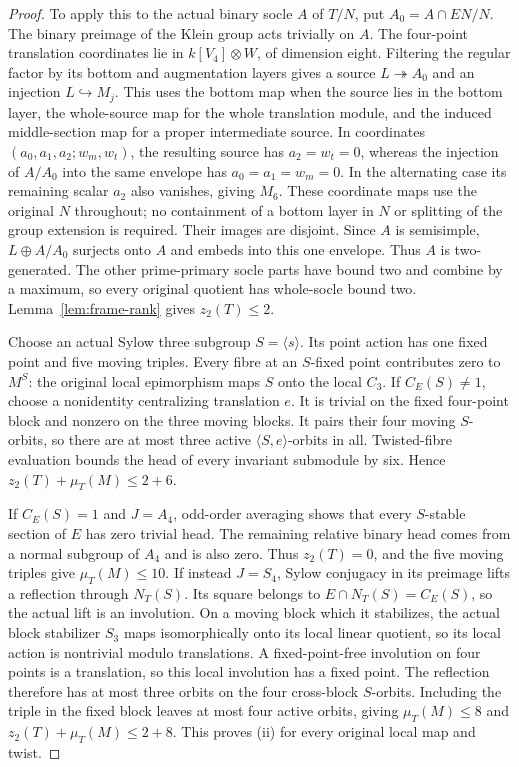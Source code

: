 \begin{proof}
To apply this to the actual binary socle $A$ of $T/N$, put
$A_0=A\cap EN/N$. The binary preimage of the Klein group acts
trivially on $A$. The four-point translation coordinates lie in
$k[V_4]\otimes W$, of dimension eight. Filtering the regular factor
by its bottom and augmentation layers gives a source
$L\twoheadrightarrow A_0$ and an injection $L\hookrightarrow M_j$.
This uses the bottom map when the source lies in the bottom layer,
the whole-source map for the whole translation module, and the
induced middle-section map for a proper intermediate source. In coordinates
$(a_0,a_1,a_2;w_m,w_t)$, the resulting source has
$a_2=w_t=0$, whereas the injection of $A/A_0$ into the same envelope
has $a_0=a_1=w_m=0$. In the alternating case its remaining scalar
$a_2$ also vanishes, giving $M_6$. These coordinate maps use the
original $N$ throughout; no containment of a bottom layer in $N$
or splitting of the group extension is required.
Their images are disjoint. Since $A$ is semisimple, $L\oplus A/A_0$
surjects onto $A$ and embeds into this one envelope. Thus $A$ is
two-generated. The other prime-primary socle parts have bound two
and combine by a maximum, so every original quotient has whole-socle
bound two. Lemma~\ref{lem:frame-rank} gives $z_2(T)\leq2$.

Choose an actual Sylow three subgroup $S=\langle s\rangle$.
Its point action has one fixed point and five moving triples.
Every fibre at an $S$-fixed point contributes zero to $M^S$:
the original local epimorphism maps $S$ onto the local $C_3$.
If $C_E(S)\ne1$, choose a nonidentity centralizing translation $e$.
It is trivial on the fixed four-point block and nonzero on the
three moving blocks. It pairs their four moving $S$-orbits, so
there are at most three active $\langle S,e\rangle$-orbits in all.
Twisted-fibre evaluation bounds the head of every invariant
submodule by six. Hence $z_2(T)+\mu_T(M)\leq2+6$.

If $C_E(S)=1$ and $J=A_4$, odd-order averaging shows that every
$S$-stable section of $E$ has zero trivial head. The remaining
relative binary head comes from a normal subgroup of $A_4$ and
is also zero. Thus $z_2(T)=0$, and the five moving triples give
$\mu_T(M)\leq10$.
If instead $J=S_4$, Sylow conjugacy in its preimage lifts a
reflection through $N_T(S)$.
Its square belongs to $E\cap N_T(S)=C_E(S)$, so the actual lift
is an involution. On a moving block which it stabilizes, the actual
block stabilizer $S_3$ maps isomorphically onto its local linear
quotient, so its local action is nontrivial modulo translations.
A fixed-point-free
involution on four points is a translation, so this local
involution has a fixed point. The reflection therefore has at
most three orbits on the four cross-block $S$-orbits. Including
the triple in the fixed block leaves at most four active orbits,
giving $\mu_T(M)\leq8$ and $z_2(T)+\mu_T(M)\leq2+8$.
This proves (ii) for every original local map and twist.


\end{proof}
